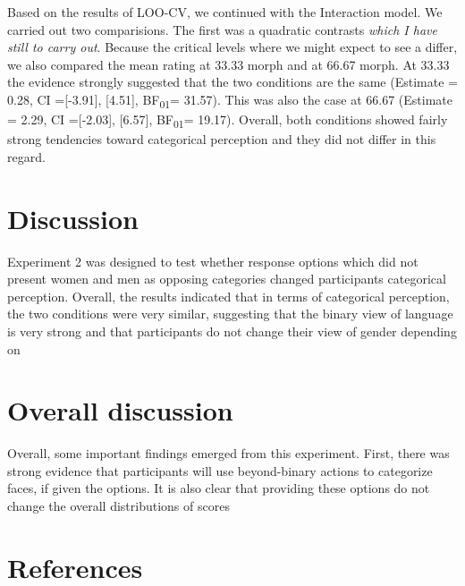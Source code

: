 \documentclass[
  man]{apa7}
\begin{document}
Based on the results of LOO-CV, we continued with the Interaction model. We carried out two comparisions. The first was a quadratic contrasts \emph{which I have still to carry out}. Because the critical levels where we might expect to see a differ, we also compared the mean rating at 33.33 morph and at 66.67 morph. At 33.33 the evidence strongly suggested that the two conditions are the same
(Estimate = 0.28, CI ={[}-3.91{]}, {[}4.51{]}, BF\textsubscript{01}= 31.57). This was also the case at 66.67
(Estimate = 2.29, CI ={[}-2.03{]}, {[}6.57{]}, BF\textsubscript{01}= 19.17). Overall, both conditions showed fairly strong tendencies toward categorical perception and they did not differ in this regard.

\hypertarget{discussion-1}{%
\section{Discussion}\label{discussion-1}}

Experiment 2 was designed to test whether response options which did not present women and men as opposing categories changed participants categorical perception. Overall, the results indicated that in terms of categorical perception, the two conditions were very similar, suggesting that the binary view of language is very strong and that participants do not change their view of gender depending on

\hypertarget{overall-discussion}{%
\section{Overall discussion}\label{overall-discussion}}

Overall, some important findings emerged from this experiment. First, there was strong evidence that participants will use beyond-binary actions to categorize faces, if given the options. It is also clear that providing these options do not change the overall distributions of scores

\newpage

\hypertarget{references}{%
\section{References}\label{references}}
\end{document}
